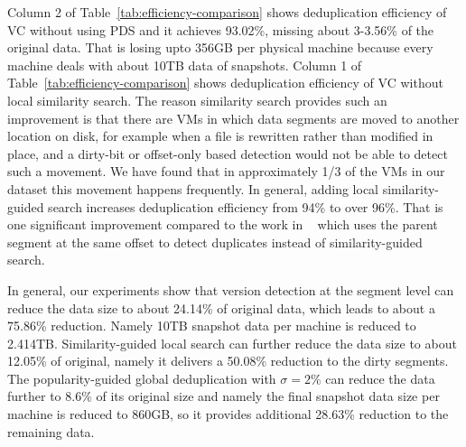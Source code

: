 Column 2 of Table~\ref{tab:efficiency-comparison} shows deduplication efficiency of VC without 
using PDS and it achieves 93.02\%, missing about 3-3.56\% of the original data. That is losing upto
356GB per physical machine because every machine deals with about 10TB data of snapshots. 
Column 1 of Table~\ref{tab:efficiency-comparison} shows deduplication efficiency of VC without 
local similarity search.
The reason similarity search provides such an improvement is that
there are VMs in which
data  segments are moved to another location on disk, for example when a file is rewritten
rather than modified in place,  
and a dirty-bit or offset-only based detection would not be able to detect such a movement.
We have found that in
approximately 1/3 of the VMs in our dataset this movement happens frequently.
In general, adding local similarity-guided search increases deduplication efficiency from 94\% to over 96\%.
That is one significant improvement compared to the work in ~\cite{WeiZhangIEEE}
which uses the parent segment at the same offset to detect duplicates instead of similarity-guided search.

In general, our experiments show that
version detection at the segment level can reduce the data size to about 24.14\% of original data, 
which leads to about a 75.86\% reduction. Namely 10TB snapshot data per machine is reduced to 2.414TB.
Similarity-guided local search can further reduce the data size
to about 12.05\% of original, namely it delivers a 50.08\% reduction to the dirty segments.
The popularity-guided global deduplication with $\sigma=2\% $
can reduce the data further to 8.6\% of its original size and namely the final snapshot data size per machine
is reduced to 860GB, so it provides additional 28.63\% reduction to the remaining data.


